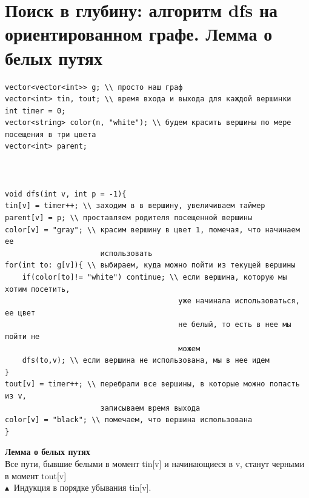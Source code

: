 \section{Поиск в глубину: алгоритм dfs на ориентированном графе. Лемма о белых путях}
\begin{verbatim}
vector<vector<int>> g; \\ просто наш граф
vector<int> tin, tout; \\ время входа и выхода для каждой вершинки
int timer = 0;
vector<string> color(n, "white"); \\ будем красить вершины по мере посещения в три цвета
vector<int> parent;



void dfs(int v, int p = -1){
tin[v] = timer++; \\ заходим в в вершину, увеличиваем таймер
parent[v] = p; \\ проставляем родителя посещенной вершины
color[v] = "gray"; \\ красим вершину в цвет 1, помечая, что начинаем ее
                      использовать
for(int to: g[v]){ \\ выбираем, куда можно пойти из текущей вершины
    if(color[to]!= "white") continue; \\ если вершина, которую мы хотим посетить,
                                        уже начинала использоваться, ее цвет 
                                        не белый, то есть в нее мы пойти не
                                        можем
    dfs(to,v); \\ если вершина не использована, мы в нее идем
}
tout[v] = timer++; \\ перебрали все вершины, в которые можно попасть из v, 
                      записываем время выхода
color[v] = "black"; \\ помечаем, что вершина использована
}
\end{verbatim}
\textbf{Лемма о белых путях}
\\
Все пути, бывшие белыми в момент tin[v] и начинающиеся в v, станут черными в момент tout[v]
\\
$\blacktriangle \ $ Индукция в порядке убывания tin[v].
